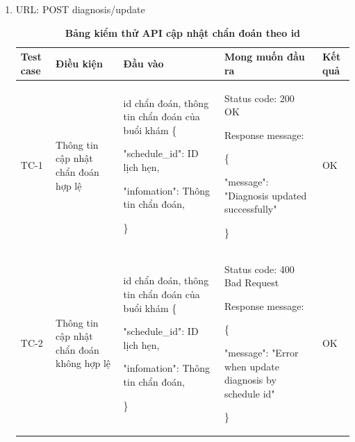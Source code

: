 \begin{enumerate}
	\item URL: POST diagnosis/update
	      \begin{xltabular}{\textwidth}{
		      | >{\raggedright\arraybackslash}p{1cm}
		      | >{\raggedright\arraybackslash}p{2.5cm}
		      | >{\raggedright\arraybackslash}X
		      | >{\raggedright\arraybackslash}X
		      | >{\raggedright\arraybackslash}p{1cm}|
		      }
		      \caption{\bfseries \fontsize{12pt}{0pt}\selectfont Bảng kiểm thử API cập nhật chẩn đoán theo id}
		      \\
		      \hline
		      \bfseries Test case    &\bfseries Điều kiện   &\bfseries Đầu vào
		      &\bfseries Mong muốn đầu ra &\bfseries Kết quả\\ \hline


		      TC-1
		      & Thông tin cập nhật chẩn đoán hợp lệ
		      & id chẩn đoán, thông tin chẩn đoán của buổi khám
		      \{

		      "schedule\_id": ID lịch hẹn,

		      "infomation": Thông tin chẩn đoán,

		      \}
		      &

		      Status code: 200 OK

		      Response message:

		      \{

		      "message": "Diagnosis updated successfully"

		      \}

		      & OK

		      \\ \hline

		      TC-2
		      & Thông tin cập nhật chẩn đoán không hợp lệ
		      & id chẩn đoán, thông tin chẩn đoán của buổi khám
		      \{

		      "schedule\_id": ID lịch hẹn,

		      "infomation": Thông tin chẩn đoán,

		      \}
		      &

		      Status code: 400 Bad Request

		      Response message:

		      \{

		      "message": "Error when update diagnosis by schedule id"

		      \}

		      & OK

		      \\ \hline

	      \end{xltabular}
\end{enumerate}

